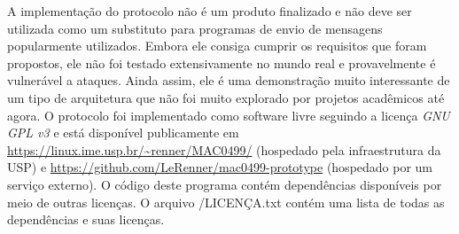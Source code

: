 A implementação do protocolo não é um produto finalizado e não deve ser utilizada como um substituto para programas de envio de mensagens popularmente utilizados. Embora ele consiga cumprir os requisitos que foram propostos, ele não foi testado extensivamente no mundo real e provavelmente é vulnerável a ataques. Ainda assim, ele é uma demonstração muito interessante de um tipo de arquitetura que não foi muito explorado por projetos acadêmicos até agora. O protocolo foi implementado como software livre seguindo a licença \textit{GNU GPL v3} e está disponível publicamente em \url{https://linux.ime.usp.br/~renner/MAC0499/} (hospedado pela infraestrutura da USP) e \url{https://github.com/LeRenner/mac0499-prototype} (hospedado por um serviço externo). O código deste programa contém dependências disponíveis por meio de outras licenças. O arquivo /LICENÇA.txt contém uma lista de todas as dependências e suas licenças.